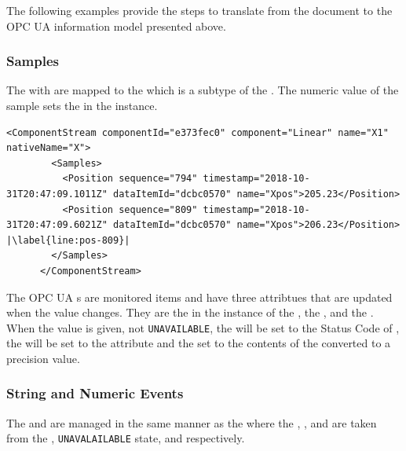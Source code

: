 The following examples provide the steps to translate from the  document to the OPC UA information model presented above.

\subsubsection{Samples}

The  with   are mapped to the  which is a subtype of the  . The numeric value of the sample sets the  in the   instance.

\begin{lstlisting}[firstnumber=last,escapechar=|,%
    caption={Linear Component Stream},label={lst:linear-component-stream}]
      <ComponentStream componentId="e373fec0" component="Linear" name="X1" nativeName="X"> 
        <Samples>
          <Position sequence="794" timestamp="2018-10-31T20:47:09.1011Z" dataItemId="dcbc0570" name="Xpos">205.23</Position>
          <Position sequence="809" timestamp="2018-10-31T20:47:09.6021Z" dataItemId="dcbc0570" name="Xpos">206.23</Position> |\label{line:pos-809}|
        </Samples>
      </ComponentStream>
\end{lstlisting}

The OPC UA s are monitored items and have three attribtues that are updated when the value changes. They are the  in the instance of the , the , and the . When the value is given, not \texttt{UNAVAILABLE}, the  will be set to the Status Code of , the  will be set to the  attribute and the  set to the contents of the  converted to a  precision value.

\subsubsection{String and Numeric Events}\label{sec:sting-numeric-events}

The  and   are managed in the same manner as the  where the , , and  are taken from the , \texttt{UNAVALAILABLE} state, and  respectively.

